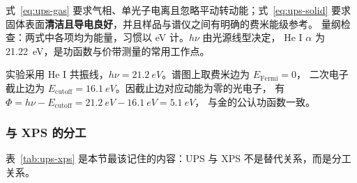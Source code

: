 \begin{keycond}
式~\eqref{eq:ups-gas} 要求气相、单光子电离且忽略平动转动能；式~\eqref{eq:ups-solid}
要求固体表面\textbf{清洁且导电良好}，并且样品与谱仪之间有明确的费米能级参考。
量纲检查：两式中各项均为能量，习惯以 \unit{eV} 计。$h\nu$ 由光源线型决定，
He I $\alpha$ 为 \qty{21.22}{eV}，是功函数与价带测量的常用工作点。
\end{keycond}

\begin{example}
实验采用 He I 共振线，$h\nu=\qty{21.2}{eV}$。谱图上取费米边为 $E_{\mathrm{Fermi}}=0$，
二次电子截止边为 $E_{\mathrm{cutoff}}=\qty{16.1}{eV}$。因截止边对应动能为零的光电子，
有 $\Phi=h\nu-E_{\mathrm{cutoff}}=\qty{21.2}{eV}-\qty{16.1}{eV}=\qty{5.1}{eV}$，
与金的公认功函数一致。
\end{example}

\subsubsection{与 XPS 的分工}

表~\ref{tab:ups-xps} 是本节最该记住的内容：UPS 与 XPS 不是替代关系，而是分工关系。

